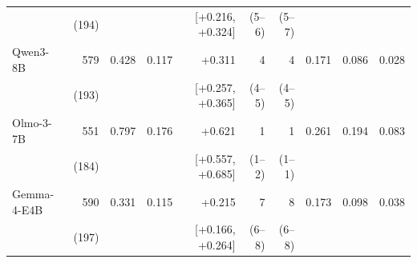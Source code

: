 \begin{tabular}{lrrrrrrrrr}
 & (194) &  &  & [+0.216, +0.324] & (5--6) & (5--7) &  &  &  \\[2pt]
Qwen3-8B & 579 & 0.428 & 0.117 & +0.311 & 4 & 4 & 0.171 & 0.086 & 0.028 \\
 & (193) &  &  & [+0.257, +0.365] & (4--5) & (4--5) &  &  &  \\[2pt]
Olmo-3-7B & 551 & 0.797 & 0.176 & +0.621 & 1 & 1 & 0.261 & 0.194 & 0.083 \\
 & (184) &  &  & [+0.557, +0.685] & (1--2) & (1--1) &  &  &  \\[2pt]
Gemma-4-E4B & 590 & 0.331 & 0.115 & +0.215 & 7 & 8 & 0.173 & 0.098 & 0.038 \\
 & (197) &  &  & [+0.166, +0.264] & (6--8) & (6--8) &  &  &  \\
\bottomrule
\end{tabular}
